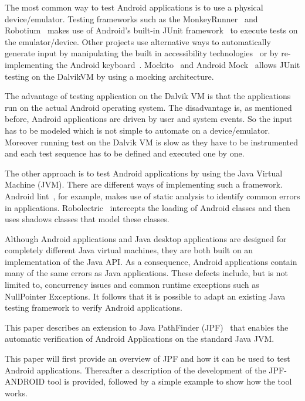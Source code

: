 \documentclass{acm_proc_article-sp}
\begin{document}
The most common way to test Android applications is to use a physical device/emulator. Testing frameworks such as
the MonkeyRunner~\cite{monkey} and Robotium~\cite{robotium} makes use of Android's built-in JUnit framework~\cite{TestingAndroid} to
execute tests on the emulator/device. Other projects use alternative ways to automatically generate input by manipulating the built in
accessibility technologies~\cite{AccessibilityTech} or by re-implementing the Android keyboard~\cite{KeyboardModel}. Mockito~\cite{mockito}
and Android Mock~\cite{androidMock} allows JUnit testing on the DalvikVM by using a mocking architecture.

The advantage of testing application on the Dalvik VM is that the applications run on the actual Android operating system. The
disadvantage is, as mentioned before, Android applications are driven by user and system events. So the input has to be modeled which is
not simple to automate on a device/emulator. Moreover running test on the Dalvik VM is slow as they have to be instrumented and each test sequence has
to be defined and executed one by one. 
 
The other approach is to test Android applications by using the Java Virtual Machine (JVM). There are different ways of implementing such a
framework. Android
lint~\cite{lint}, for example, makes use of static analysis to identify common errors in applications. Robolectric~\cite{robolectric}
intercepts the loading of Android classes and then uses shadows classes that model these classes.

Although Android applications and Java desktop applications are designed for completely different Java virtual machines, they are both
built on an implementation of the Java API. As a consequence, Android applications contain many of the
same errors as Java applications. These defects include, but is not limited to, concurrency issues and common runtime exceptions such as NullPointer Exceptions. It follows that it
is possible to adapt an existing Java testing framework to verify Android applications.

This paper describes an extension to Java PathFinder (JPF)~\cite{JPFDocs} that enables the automatic
verification of Android Applications on the standard Java JVM. 

This paper will first provide an overview of JPF and how it can be used to test Android applications. Thereafter a description of the
development of the JPF-ANDROID tool is provided, followed by a simple example to show how the tool works.
\end{document}
